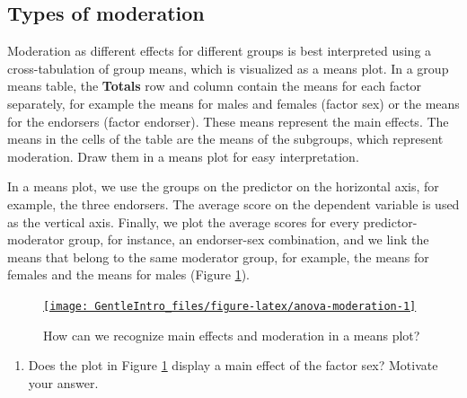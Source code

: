 \documentclass[a4paper]{book}
\providecommand{\tightlist}{%
  \setlength{\itemsep}{0pt}\setlength{\parskip}{0pt}}
\theoremstyle{definition}
\theoremstyle{definition}
\theoremstyle{definition}
\theoremstyle{remark}
\begin{document}
\subsection{Types of moderation}\label{types-of-moderation}

Moderation as different effects for different groups is best interpreted
using a cross-tabulation of group means, which is visualized as a means
plot. In a group means table, the \textbf{Totals} row and column contain
the means for each factor separately, for example the means for males
and females (factor sex) or the means for the endorsers (factor
endorser). These means represent the main effects. The means in the
cells of the table are the means of the subgroups, which represent
moderation. Draw them in a means plot for easy interpretation.

In a means plot, we use the groups on the predictor on the horizontal
axis, for example, the three endorsers. The average score on the
dependent variable is used as the vertical axis. Finally, we plot the
average scores for every predictor-moderator group, for instance, an
endorser-sex combination, and we link the means that belong to the same
moderator group, for example, the means for females and the means for
males (Figure \ref{fig:anova-moderation}).

\begin{figure}[H]
\href{http://82.196.4.233:3838/apps/anova-moderation/}{\texttt{[image: GentleIntro\_files/figure-latex/anova-moderation-1]} }\caption{How can we recognize main effects and moderation in a means plot?}\label{fig:anova-moderation}
\end{figure}

\begin{enumerate}
\def\labelenumi{\arabic{enumi}.}
\tightlist
\item
  Does the plot in Figure \ref{fig:anova-moderation} display a main
  effect of the factor sex? Motivate your answer.
\end{enumerate}
\end{document}
